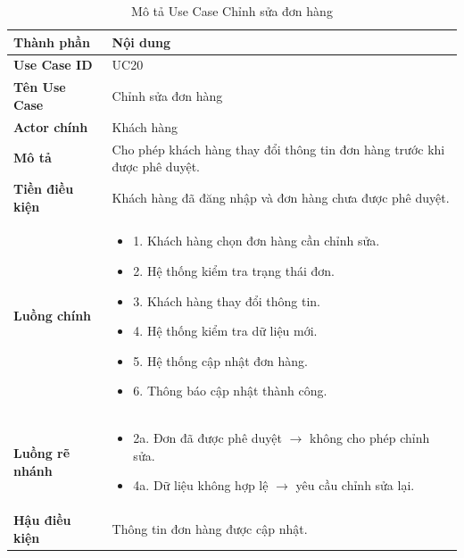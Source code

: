 \begin{longtable}{|L{3cm}|L{11cm}|}
\caption{Mô tả Use Case Chỉnh sửa đơn hàng}
\label{tab:mo-ta-uc20-chinh-sua-don}
\\
\hline
\textbf{Thành phần} & \textbf{Nội dung} \\
\hline
\textbf{Use Case ID} & UC20 \\
\hline
\textbf{Tên Use Case} & Chỉnh sửa đơn hàng \\
\hline
\textbf{Actor chính} & Khách hàng \\
\hline
\textbf{Mô tả} & Cho phép khách hàng thay đổi thông tin đơn hàng trước khi được phê duyệt. \\
\hline
\textbf{Tiền điều kiện} & Khách hàng đã đăng nhập và đơn hàng chưa được phê duyệt. \\
\hline
\textbf{Luồng chính} & \begin{itemize}[leftmargin=*,topsep=2pt,itemsep=2pt]
\item 1. Khách hàng chọn đơn hàng cần chỉnh sửa.
\item 2. Hệ thống kiểm tra trạng thái đơn.
\item 3. Khách hàng thay đổi thông tin.
\item 4. Hệ thống kiểm tra dữ liệu mới.
\item 5. Hệ thống cập nhật đơn hàng.
\item 6. Thông báo cập nhật thành công.
\end{itemize} \\
\hline
\textbf{Luồng rẽ nhánh} & \begin{itemize}[leftmargin=*,topsep=2pt,itemsep=2pt]
\item 2a. Đơn đã được phê duyệt $\rightarrow$ không cho phép chỉnh sửa.
\item 4a. Dữ liệu không hợp lệ $\rightarrow$ yêu cầu chỉnh sửa lại.
\end{itemize} \\
\hline
\textbf{Hậu điều kiện} & Thông tin đơn hàng được cập nhật. \\
\hline
\end{longtable}

